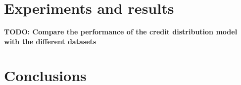 \documentclass{acm_proc_article-sp}
\begin{document}
\section{Experiments and results}
\textbf{TODO: Compare the performance of the credit distribution model with the different datasets}

\section{Conclusions}


%

%

\balancecolumns
\end{document}
